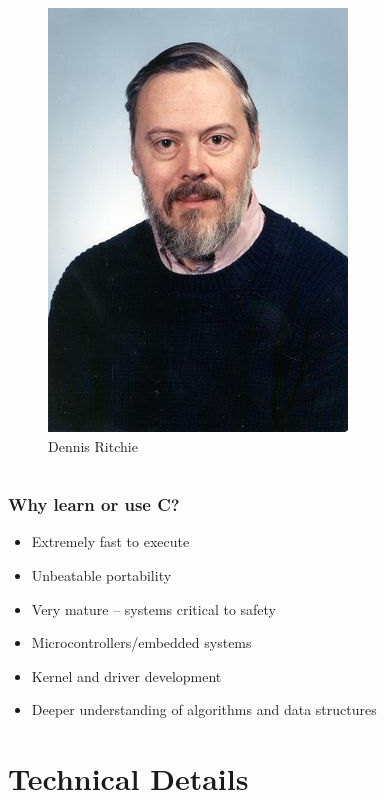 \documentclass{beamer}
\begin{document}
\begin{frame}
\begin{columns}

        \begin{figure}
            \centering
            \includegraphics[scale=0.5]{dennisritchie.jpg}
            \caption*{Dennis Ritchie}
            \label{fig:ritch}
        \end{figure}
    \end{columns}
\end{frame}

\begin{frame}
    \frametitle{Why learn or use C?}
    \begin{itemize}[<+->]
        \item Extremely fast to execute
        \item Unbeatable portability
        \item Very mature -- systems critical to safety
        \item Microcontrollers/embedded systems
        \item Kernel and driver development
        \item Deeper understanding of algorithms and data structures
    \end{itemize}
\end{frame}

\section{Technical Details}
\end{document}
